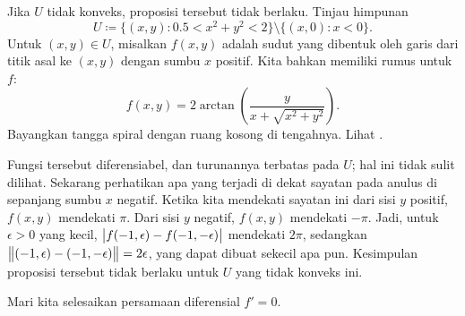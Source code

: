 \begin{example}
Jika $U$ tidak konveks, proposisi tersebut tidak berlaku. Tinjau
himpunan
\begin{equation*}
U \coloneqq \bigl\{ (x,y) : 0.5 < x^2+y^2 < 2 \bigr\}
\setminus \bigl\{ (x,0) : x < 0 \bigr\} .
\end{equation*}
Untuk $(x,y) \in U$,
misalkan $f(x,y)$ adalah sudut yang dibentuk oleh garis dari titik asal ke $(x,y)$
dengan sumbu $x$ positif.  Kita bahkan memiliki rumus untuk $f$:
\begin{equation*}
f(x,y) = 2 \operatorname{arctan}\left( \frac{y}{x+\sqrt{x^2+y^2}}\right) .
\end{equation*}
Bayangkan tangga spiral dengan ruang kosong di tengahnya.  Lihat
.

\begin{myfigureht}
\caption{Fungsi non-Lipschitz dengan turunan yang terbatas
secara seragam.\label{mv:fignonlip}}
\end{myfigureht}

Fungsi tersebut diferensiabel,
dan turunannya terbatas pada $U$; hal ini tidak sulit dilihat.  Sekarang
perhatikan
apa yang terjadi di dekat sayatan pada anulus di sepanjang sumbu $x$ negatif.
Ketika kita mendekati sayatan ini dari sisi $y$ positif, $f(x,y)$ mendekati $\pi$.
Dari sisi $y$ negatif, $f(x,y)$ mendekati $-\pi$.
Jadi, untuk $\epsilon > 0$ yang kecil, $\bigl\lvert {f(-1,\epsilon)-f(-1,-\epsilon)} \bigr\rvert$
mendekati $2\pi$, sedangkan $\bigl\lVert {(-1,\epsilon)-(-1,-\epsilon)} \bigr\rVert = 2\epsilon$,
yang dapat dibuat sekecil apa pun.  Kesimpulan proposisi tersebut tidak
berlaku untuk $U$ yang tidak konveks ini.
\end{example}

Mari kita selesaikan persamaan diferensial $f' = 0$.


